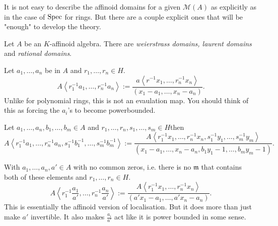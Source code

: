 It is not easy to describe the affinoid domains for a given $\mathcal{M} (A)$ as explicitly as in the case of $\operatorname{Spec}$ for rings. 
But there are a couple explicit ones that will be "enough" to develop the theory. 
\begin{definition}
	Let $A$ be an $K$-affinoid algebra. 
		There are \emph{weierstrass domains, laurent domains} and \emph{rational domains}. 
	\begin{description}
		\item[Weierstrass domain] Let $a_1, \ldots, a_n$ be in $A$ and $r_1, \ldots, r_n \in H$. 
			\[
				A\left<r_1^{-1}a_1, \ldots, r_n^{-1}a_n \right> := \frac{a\left<r^{-1}x_1, \ldots, r^{-1}_nx_n \right>}{(x_1-a_1, \ldots, x_n - a_n)}
			.\] 
			Unlike for polynomial rings, this is not an evaulation map. You should think of this as forcing the $a_i$'s to become powerbounded. 
		\item [Laurent domains]
			Let $a_1, \ldots, a_n, b_1, \ldots, b_m \in A$ and $r_1,\ldots, r_n, s_1, \ldots, s_m \in H$then \[
				A\left<r_1^{-1}a_1, \ldots, r_n^{-1}a_n, s^{-1}_1b_1^{-1}, \ldots, s^{-1}_mb_m^{-1} \right> := \frac{A\left<r^{-1}_1x_1, \ldots, r^{-1}_nx_n,s^{-1}_1y_1, \ldots,s_m^{-1} y_m  \right>}{(x_1 - a_1, \ldots, x_n - a_n, b_1 y_1 - 1, \ldots, b_m y_m - 1)}
			.\] 
		\item[Rational domain] With $a_1, \ldots, a_n, a' \in A$ with no common zeros, i.e. there is no $\mathfrak{m} $ that contains both of these elements and $r_1, \ldots, r_n \in H$. 
			\[
				A \left<r_1^{-1}\frac{a_1}{a'}, \ldots, r_n^{-1}\frac{a_n}{a'} \right> := \frac{A\left<r_1^{-1}x_1, \ldots, r_n^{-1}x_n \right>}{(a' x_1 - a_1, \ldots, a' x_n - a_n)}
			.\] 
			This is essentially the affinoid version of localisation.
			But it does more than just make $a'$ invertible. 
			It also makes $\frac{a_i}{ a'}$ act like it is power bounded in some sense. 
		\item 
	\end{description}

\end{definition}

